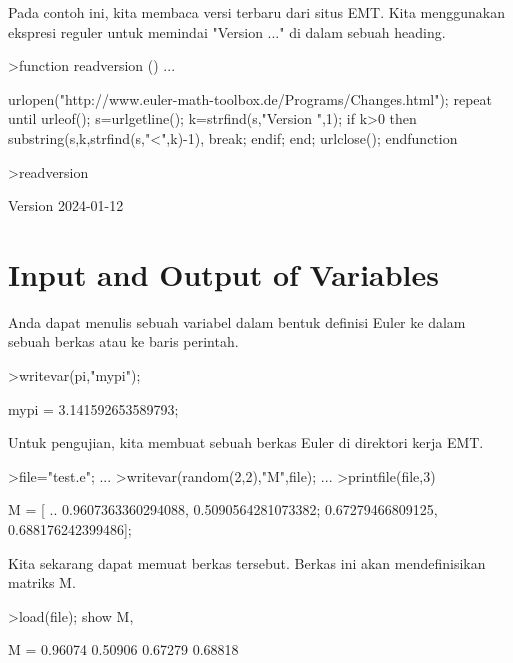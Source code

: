 \documentclass{article}
\newenvironment{eulernotebook}{\par}{\par}
\newcommand{\eulerheading}[1]{\section{#1}}
\newenvironment{eulercomment}{\par\medskip}{\par\medskip}
\begin{document}
\begin{eulernotebook}
\begin{eulercomment}
\begin{eulercomment}
\begin{eulercomment}
\begin{eulercomment}
\begin{eulercomment}
\begin{eulercomment}
\begin{eulercomment}
Pada contoh ini, kita membaca versi terbaru dari situs EMT. Kita
menggunakan ekspresi reguler untuk memindai "Version ..." di dalam
sebuah heading.
\end{eulercomment}
\begin{eulerprompt}
>function readversion () ...
\end{eulerprompt}
\begin{eulerudf}
  urlopen("http://www.euler-math-toolbox.de/Programs/Changes.html");
  repeat
    until urleof();
    s=urlgetline();
    k=strfind(s,"Version ",1);
    if k>0 then substring(s,k,strfind(s,"<",k)-1), break; endif;
  end;
  urlclose();
  endfunction
\end{eulerudf}
\begin{eulerprompt}
>readversion
\end{eulerprompt}
\begin{euleroutput}
  Version 2024-01-12
\end{euleroutput}
\eulerheading{Input and Output of Variables}
\begin{eulercomment}
Anda dapat menulis sebuah variabel dalam bentuk definisi Euler ke
dalam sebuah berkas atau ke baris perintah.
\end{eulercomment}
\begin{eulerprompt}
>writevar(pi,"mypi");
\end{eulerprompt}
\begin{euleroutput}
  mypi = 3.141592653589793;
\end{euleroutput}
\begin{eulercomment}
Untuk pengujian, kita membuat sebuah berkas Euler di direktori kerja
EMT.
\end{eulercomment}
\begin{eulerprompt}
>file="test.e"; ...
>writevar(random(2,2),"M",file); ...
>printfile(file,3)
\end{eulerprompt}
\begin{euleroutput}
  M = [ ..
  0.9607363360294088, 0.5090564281073382;
  0.67279466809125, 0.688176242399486];
\end{euleroutput}
\begin{eulercomment}
Kita sekarang dapat memuat berkas tersebut. Berkas ini akan
mendefinisikan matriks M.
\end{eulercomment}
\begin{eulerprompt}
>load(file); show M,
\end{eulerprompt}
\begin{euleroutput}
  M = 
    0.96074   0.50906 
    0.67279   0.68818 

\end{euleroutput}
\end{eulercomment}
\end{eulercomment}
\end{eulercomment}
\end{eulercomment}
\end{eulercomment}
\end{eulercomment}
\end{eulernotebook}
\end{document}
